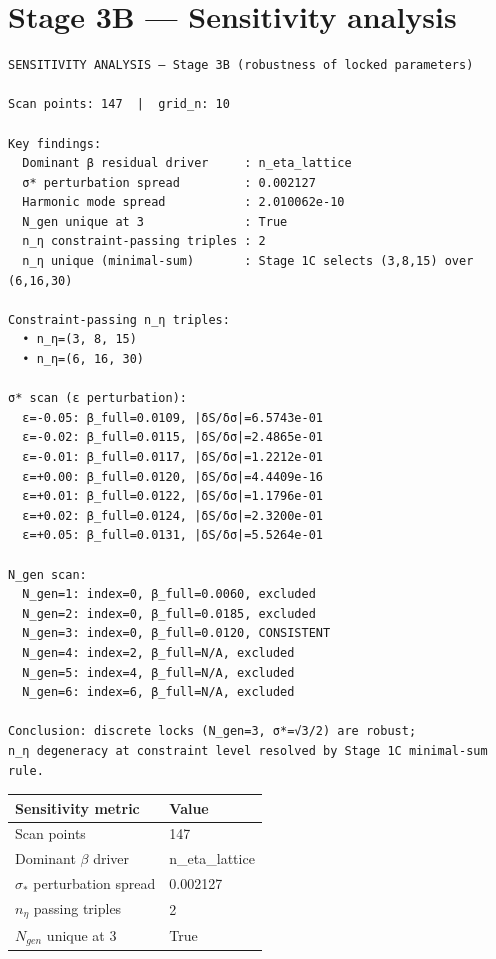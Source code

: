 \documentclass{article}
\begin{document}
\section{Stage 3B --- Sensitivity analysis}
\begin{verbatim}
SENSITIVITY ANALYSIS — Stage 3B (robustness of locked parameters)

Scan points: 147  |  grid_n: 10

Key findings:
  Dominant β residual driver     : n_eta_lattice
  σ* perturbation spread         : 0.002127
  Harmonic mode spread           : 2.010062e-10
  N_gen unique at 3              : True
  n_η constraint-passing triples : 2
  n_η unique (minimal-sum)       : Stage 1C selects (3,8,15) over (6,16,30)

Constraint-passing n_η triples:
  • n_η=(3, 8, 15)
  • n_η=(6, 16, 30)

σ* scan (ε perturbation):
  ε=-0.05: β_full=0.0109, |δS/δσ|=6.5743e-01
  ε=-0.02: β_full=0.0115, |δS/δσ|=2.4865e-01
  ε=-0.01: β_full=0.0117, |δS/δσ|=1.2212e-01
  ε=+0.00: β_full=0.0120, |δS/δσ|=4.4409e-16
  ε=+0.01: β_full=0.0122, |δS/δσ|=1.1796e-01
  ε=+0.02: β_full=0.0124, |δS/δσ|=2.3200e-01
  ε=+0.05: β_full=0.0131, |δS/δσ|=5.5264e-01

N_gen scan:
  N_gen=1: index=0, β_full=0.0060, excluded
  N_gen=2: index=0, β_full=0.0185, excluded
  N_gen=3: index=0, β_full=0.0120, CONSISTENT
  N_gen=4: index=2, β_full=N/A, excluded
  N_gen=5: index=4, β_full=N/A, excluded
  N_gen=6: index=6, β_full=N/A, excluded

Conclusion: discrete locks (N_gen=3, σ*=√3/2) are robust;
n_η degeneracy at constraint level resolved by Stage 1C minimal-sum rule.
\end{verbatim}
\begin{center}
\begin{tabular}{ll}
\hline
Sensitivity metric & Value \\
\hline
Scan points & 147 \\
Dominant $\beta$ driver & n_eta_lattice \\
$\sigma_*$ perturbation spread & 0.002127 \\
$n_\eta$ passing triples & 2 \\
$N_{gen}$ unique at 3 & True \\
\hline
\end{tabular}
\end{center}
\end{document}
